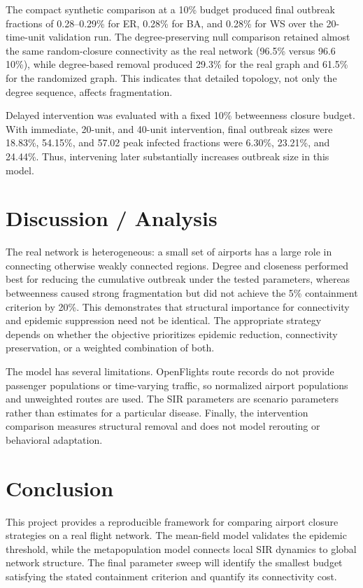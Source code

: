\documentclass[conference]{IEEEtran}
\begin{document}
The compact synthetic comparison at a 10\% budget produced final
outbreak fractions of 0.28--0.29\% for ER, 0.28\% for BA, and
0.28\% for WS over the 20-time-unit validation run. The degree-preserving
null comparison retained almost the same random-closure connectivity as
the real network (96.5\% versus 96.6%
10\%), while degree-based removal produced 29.3\% for the real graph
and 61.5\% for the randomized graph. This indicates that detailed
topology, not only the degree sequence, affects fragmentation.

Delayed intervention was evaluated with a fixed 10\% betweenness closure
budget. With immediate, 20-unit, and 40-unit intervention, final
outbreak sizes were 18.83\%, 54.15\%, and 57.02%
peak infected fractions were 6.30\%, 23.21\%, and 24.44\%. Thus,
intervening later substantially increases outbreak size in this model.

\section{Discussion / Analysis}
The real network is heterogeneous: a small set of airports has a large
role in connecting otherwise weakly connected regions. Degree and
closeness performed best for reducing the cumulative outbreak under the
tested parameters, whereas betweenness caused strong fragmentation but
did not achieve the 5\% containment criterion by 20\%. This demonstrates
that structural importance for connectivity and epidemic suppression
need not be identical. The appropriate strategy depends on whether the
objective prioritizes epidemic reduction, connectivity preservation, or
a weighted combination of both.

The model has several limitations. OpenFlights route records do not
provide passenger populations or time-varying traffic, so normalized
airport populations and unweighted routes are used. The SIR parameters
are scenario parameters rather than estimates for a particular disease.
Finally, the intervention comparison measures structural removal and
does not model rerouting or behavioral adaptation.

\section{Conclusion}
This project provides a reproducible framework for comparing airport
closure strategies on a real flight network. The mean-field model
validates the epidemic threshold, while the metapopulation model
connects local SIR dynamics to global network structure. The final
parameter sweep will identify the smallest budget satisfying the stated
containment criterion and quantify its connectivity cost.



\end{document}
